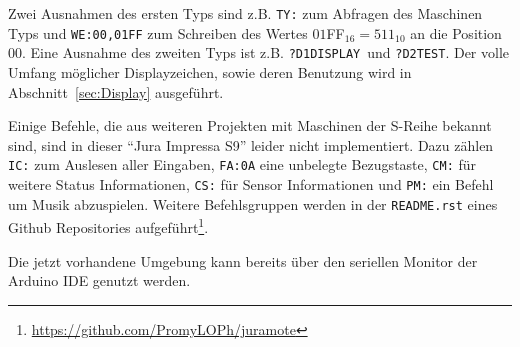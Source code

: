 Zwei Ausnahmen des ersten Typs sind z.B. \texttt{TY:} zum Abfragen des Maschinen Typs und \texttt{WE:00,01FF} zum Schreiben des Wertes $01$FF$_{16} = 511_{10}$ an die Position $00$.
Eine Ausnahme des zweiten Typs ist z.B. \texttt{?D1DISPLAY}\textvisiblespace\ und \texttt{?D2}\textvisiblespace\textvisiblespace\texttt{TEST}\textvisiblespace\textvisiblespace.
Der volle Umfang möglicher Displayzeichen, sowie deren Benutzung wird in Abschnitt~\ref{sec:Display} ausgeführt.

Einige Befehle, die aus weiteren Projekten mit Maschinen der S-Reihe bekannt sind, sind in dieser "`Jura Impressa S9"' leider nicht implementiert.
Dazu zählen \texttt{IC:} zum Auslesen aller Eingaben, \texttt{FA:0A} eine unbelegte Bezugstaste, \texttt{CM:} für weitere Status Informationen, \texttt{CS:} für Sensor Informationen und \texttt{PM:} ein Befehl um Musik abzuspielen.
Weitere Befehlsgruppen werden in der \texttt{README.rst} eines Github Repositories aufgeführt\footnote{\url{https://github.com/PromyLOPh/juramote}}.

Die jetzt vorhandene Umgebung kann bereits über den seriellen Monitor der Arduino IDE genutzt werden.

